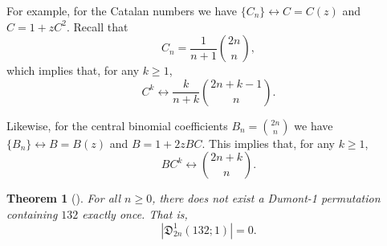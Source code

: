 \documentclass[
final
]{dmtcs-episciences}
\newtheorem{theorem}{Theorem}[section]%
\newtheorem{prop}[theorem]{Proposition}
\theoremstyle{definition}
\theoremstyle{remark}
\begin{document}
\noindent For example, for the Catalan numbers we have $\{C_n\} \longleftrightarrow  C = C(z)$ and $C = 1 +  zC^2$.
Recall that
\[
C_n = \frac{1}{n+1} \binom{2n}{n},
\]
which implies that, for any $k \ge 1$,
\[
C^k \longleftrightarrow \frac{k}{n+k} \binom{2n+k-1}{n}.
\]


Likewise, for the central binomial coefficients $\displaystyle B_n = \binom{2n}{n}$ we have $\{B_n\} \longleftrightarrow  B = B(z)$ and $B = 1 +  2zBC.$  This implies that, for any $k \ge 1$, 
$$BC^k \longleftrightarrow \binom{2n+k}{n}.$$ 

\begin{theorem}[\cite{Mansour}] \label{thm:132;1} 
For all $n\ge 0$, there does not exist a Dumont-1 permutation containing $132$ exactly once.  That is,
\[
|\mathfrak{D}^1_{2n} (132;1)| = 0.
\]
\end{theorem}
%
%
%
%
\end{document}

